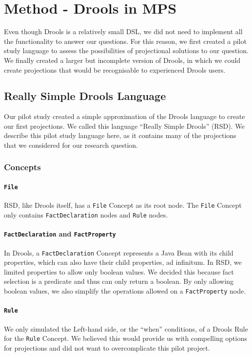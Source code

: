 \section{Method - Drools in MPS}
\label{section:dsr_method}

Even though Drools is a relatively small DSL, we did not need to implement all the functionality to answer our questions.
For this reason, we first created a pilot study language to assess the possibilities of projectional solutions to our question.
We finally created a larger but incomplete version of Drools, in which we could create projections that would be recognisable to experienced Drools users.

\subsection{Really Simple Drools Language}
Our pilot study created a simple approximation of the Drools language to create our first projections. 
We called this language ``Really Simple Drools'' (RSD).
We describe this pilot study language here, as it contains many of the projections that we considered for our research question.

\subsubsection{Concepts}

\paragraph{\texttt{File}} RSD, like Drools itself, has a \texttt{File} Concept as its root node.
The \texttt{File} Concept only contains \linebreak\texttt{FactDeclaration} nodes and \texttt{Rule} nodes.

\paragraph{\texttt{FactDeclaration} and \texttt{FactProperty}} In Drools, a \texttt{FactDeclaration} Concept represents a Java Bean with its child properties, which can also have their child properties, ad infinitum.
In RSD, we limited properties to allow only boolean values.
We decided this because fact selection is a predicate and thus can only return a boolean.
By only allowing boolean values, we also simplify the operations allowed on a \texttt{FactProperty} node.

\paragraph{\texttt{Rule}} We only simulated the Left-hand side, or the ``when'' conditions, of a Drools Rule for the \texttt{Rule} Concept.
We believed this would provide us with compelling options for projections and did not want to overcomplicate this pilot project.

